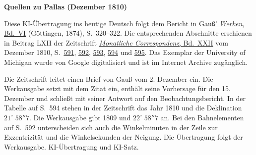 \clearpage\thispagestyle{empty}
\begin{center}\textbf{Quellen zu Pallas (Dezember 1810)}\end{center}
\noindent Diese KI-Übertragung ins heutige Deutsch folgt dem Bericht in \href{https://gdz.sub.uni-goettingen.de/id/PPN236007467}{Gauß’ \textit{Werken}, Bd.~VI} (Göttingen, 1874), S.~320--322. Die entsprechenden Abschnitte erschienen in Beitrag LXII der Zeitschrift \href{https://archive.org/download/bub_gb_YCI4AAAAMAAJ/page/n4.jpg}{\textit{Monatliche Correspondenz}, Bd.~XXII} vom Dezember 1810, S.~\href{https://archive.org/download/bub_gb_YCI4AAAAMAAJ/page/n594.jpg}{591}, \href{https://archive.org/download/bub_gb_YCI4AAAAMAAJ/page/n595.jpg}{592}, \href{https://archive.org/download/bub_gb_YCI4AAAAMAAJ/page/n596.jpg}{593}, \href{https://archive.org/download/bub_gb_YCI4AAAAMAAJ/page/n597.jpg}{594} und \href{https://archive.org/download/bub_gb_YCI4AAAAMAAJ/page/n598.jpg}{595}. Das Exemplar der University of Michigan wurde von Google digitalisiert und ist im Internet Archive zugänglich.
\par\smallskip\noindent Die Zeitschrift leitet einen Brief von Gauß vom 2. Dezember ein. Die Werkausgabe setzt mit dem Zitat ein, enthält seine Vorhersage für den 15. Dezember und schließt mit seiner Antwort auf den Beobachtungsbericht. In der Tabelle auf S.~594 stehen in der Zeitschrift das Jahr 1810 und die Deklination $21^\circ\;58''7$. Die Werkausgabe gibt 1809 und $22^\circ\;58''7$ an. Bei den Bahnelementen auf S.~592 unterscheiden sich auch die Winkelminuten in der Zeile zur Exzentrizität und die Winkelsekunden der Neigung. Die Übertragung folgt der Werkausgabe. KI-Übertragung und KI-Satz.
\clearpage
